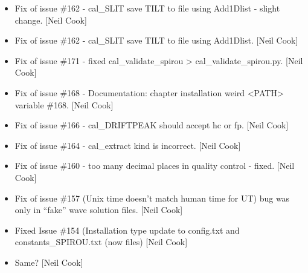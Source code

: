 \documentclass[a4paper,10pt,english]{report}
\begin{document}
\begin{itemize}
\item {} 
Fix of issue \#162 - cal\_SLIT save TILT to file using Add1Dlist -
slight change. {[}Neil Cook{]}

\item {} 
Fix of issue \#162 - cal\_SLIT save TILT to file using Add1Dlist. {[}Neil
Cook{]}

\item {} 
Fix of issue \#171 - fixed cal\_validate\_spirou \textendash{}\textgreater{}
cal\_validate\_spirou.py. {[}Neil Cook{]}

\item {} 
Fix of issue \#168 - Documentation: chapter installation weird \textless{}PATH\textgreater{}
variable \#168. {[}Neil Cook{]}

\item {} 
Fix of issue \#166 - cal\_DRIFTPEAK should accept hc or fp. {[}Neil Cook{]}

\item {} 
Fix of issue \#164 - cal\_extract kind is incorrect. {[}Neil Cook{]}

\item {} 
Fix of issue \#160 - too many decimal places in quality control -
fixed. {[}Neil Cook{]}

\item {} 
Fix of issue \#157 (Unix time doesn’t match human time for UT) bug was
only in “fake” wave solution files. {[}Neil Cook{]}

\item {} 
Fixed Issue \#154 (Installation type update to config.txt and
constants\_SPIROU.txt (now  files) {[}Neil Cook{]}

\item {} 
Same? {[}Neil Cook{]}

\end{itemize}
\end{document}
